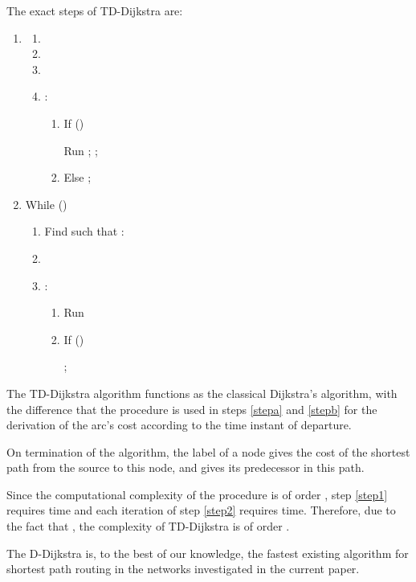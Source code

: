 \documentclass[conference]{IEEEtran}
\begin{document}
The exact steps of TD-Dijkstra are: 
\begin{enumerate}
    \item \label{step1}
    \begin{enumerate}
        \item 
        \item 
        \item 
        \item : 
        \begin{enumerate}
            \item If () 
            
             Run ; ;   \label{stepa}
            \item Else  ;  
        \end{enumerate}    
    \end{enumerate}
    \item While () \label{step2}
    \begin{enumerate}
        \item Find  such that :  
        \item 
        \item : 
         \begin{enumerate}
            \item Run  \label{stepb}
            \item If () 
            
             ;    
         \end{enumerate}   
    \end{enumerate}
\end{enumerate}

The TD-Dijkstra algorithm functions as the classical Dijkstra's algorithm, with the difference that the  procedure is used in steps \ref{stepa} and \ref{stepb} for the derivation of the arc's cost according to the time instant of departure.   

On termination of the algorithm, the label  of a node   gives the cost of the shortest path from the source to this node, and  gives its predecessor in this path.

Since the computational complexity of the  procedure is of order , step \ref{step1} requires  time and each iteration of step \ref{step2} requires  time. Therefore, due to the fact that ,  the complexity of TD-Dijkstra is of order  .

The D-Dijkstra is, to the best of our knowledge, the fastest existing algorithm for shortest path routing in the networks investigated in the current paper. 
\end{document}
